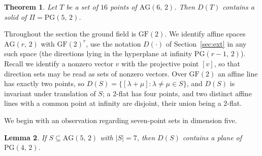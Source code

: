 \documentclass[12pt]{article}
\newtheorem{thm}{Theorem}[section]
\newtheorem{lem}[thm]{Lemma}
\theoremstyle{definition}
\numberwithin{equation}{section}
\newcommand{\la}{\lambda}
\newcommand{\GF}[1]{\mathrm{GF}(#1)}
\newcommand{\PG}[2]{\mathrm{PG}(#1,\,#2)}
\newcommand{\AG}[2]{\mathrm{AG}(#1,\,#2)}
\begin{document}
\begin{thm}\label{thm:dir16}
Let $T$ be a set of $16$ points of $\AG62$.  Then $D(T)$ contains a solid of $\Pi=\PG52$.
\end{thm}

Throughout the section the ground field is $\GF2$.  We identify affine spaces $\AG{r}{2}$ with $\GF2^r$, use the notation $D(\cdot)$ of Section~\ref{sec:ext} in any such space (the directions lying in the hyperplane at infinity $\PG{r-1}{2}$). Recall we identify a nonzero vector $v$ with the projective point $[v]$, so that direction sets may be read as sets of nonzero vectors.  Over $\GF2$ an affine line has exactly two points, so $D(S)=\{[\la+\mu]:\la\neq\mu\in S\}$, and $D(S)$ is invariant under translation of $S$; a $2$-flat has four points, and two distinct affine lines with a common point at infinity are disjoint, their union being a $2$-flat.

We begin with an observation regarding seven-point sets in dimension five.

\begin{lem}\label{lem:seven}
If $S\subseteq\AG52$ with $|S|=7$, then $D(S)$ contains a plane of $\PG42$.
\end{lem}
\end{document}
